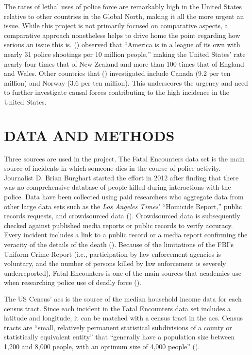 \documentclass[12pt]{article}
\begin{document}
The rates of lethal uses of police force are remarkably high in the United States relative to other countries in the Global North, making it all the more urgent an issue. While this project is not primarily focused on comparative aspects, a comparative approach nonetheless helps to drive home the point regarding how serious an issue this is. \citeauthor{espinerLicenceKillStartling2022} (\citeyear{espinerLicenceKillStartling2022}) observed that “America is in a league of its own with nearly 31 police shootings per 10 million people,” making the United States' rate nearly four times that of New Zealand and more than 100 times that of England and Wales. Other countries that \citeauthor{espinerLicenceKillStartling2022} (\citeyear{espinerLicenceKillStartling2022}) investigated include Canada (9.2 per ten million) and Norway (3.6 per ten million). This underscores the urgency and need to further investigate causal forces contributing to the high incidence in the United States.

\section{DATA AND METHODS}

Three sources are used in the project. The Fatal Encounters data set is the main source of incidents in which someone dies in the course of police activity. Journalist D. Brian Burghart started the effort in 2012 after finding that there was no comprehensive database of people killed during interactions with the police. Data have been collected using paid researchers who aggregate data from other large data sets such as the \textit{Los Angeles Times}’ “Homicide Report,” public records requests, and crowdsourced data (\cite{burghartMeFatalEncounters}). Crowdsourced data is subsequently checked against published media reports or public records to verify accuracy. Every incident includes a link to a public record or a media report confirming the veracity of the details of the death (\cite{burghartMeFatalEncounters}). Because of the limitations of the FBI’s Uniform Crime Report (i.e., participation by law enforcement agencies is voluntary, and the number of persons killed by law enforcement is severely underreported), Fatal Encounters is one of the main sources that academics use when researching police use of deadly force (\cite{feldmanKilledPoliceValidity2017, feldmanQuantifyingUnderreportingLawenforcementrelated2017, feldmanPoliceRelatedDeathsNeighborhood2019}).

The US Census’ \acrfull{acs} is the source of the median household income data for each census tract. Since each incident in the Fatal Encounters data set includes a latitude and longitude, it can be matched with a census tract in the \acrshort{acs}. Census tracts are “small, relatively permanent statistical subdivisions of a county or statistically equivalent entity” that “generally have a population size between 1,200 and 8,000 people, with an optimum size of 4,000 people” (\cite{bureauGlossary}).
\end{document}
